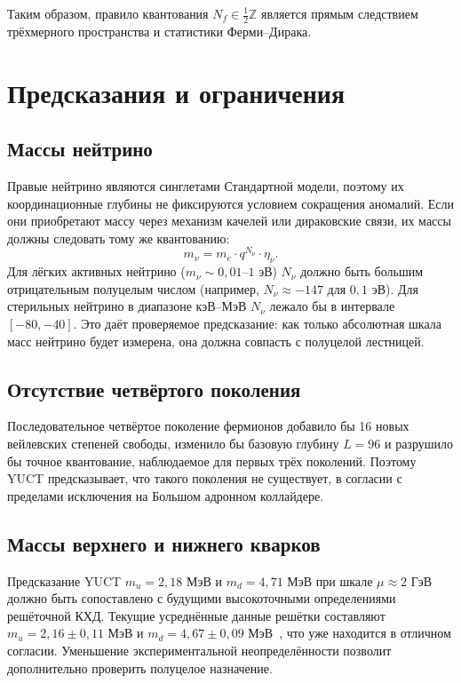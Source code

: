 \documentclass[12pt,a4paper]{article}
\begin{document}
	Таким образом, правило квантования \(N_f \in \frac{1}{2}\mathbb{Z}\) является прямым следствием трёхмерного пространства и статистики Ферми–Дирака.
	
	\section{Предсказания и ограничения}
	
	\subsection{Массы нейтрино}
	
	Правые нейтрино являются синглетами Стандартной модели, поэтому их координационные глубины не фиксируются условием сокращения аномалий. Если они приобретают массу через механизм качелей или дираковские связи, их массы должны следовать тому же квантованию:
	\begin{equation}
		m_\nu = m_e \cdot q^{N_\nu} \cdot \eta_\nu.
	\end{equation}
	Для лёгких активных нейтрино (\(m_\nu \sim 0,01\)–\(1\) эВ) \(N_\nu\) должно быть большим отрицательным полуцелым числом (например, \(N_\nu \approx -147\) для \(0,1\) эВ). Для стерильных нейтрино в диапазоне кэВ–МэВ \(N_\nu\) лежало бы в интервале \([-80, -40]\). Это даёт проверяемое предсказание: как только абсолютная шкала масс нейтрино будет измерена, она должна совпасть с полуцелой лестницей.
	
	\subsection{Отсутствие четвёртого поколения}
	
	Последовательное четвёртое поколение фермионов добавило бы 16 новых вейлевских степеней свободы, изменило бы базовую глубину \(L=96\) и разрушило бы точное квантование, наблюдаемое для первых трёх поколений. Поэтому YUCT предсказывает, что такого поколения не существует, в согласии с пределами исключения на Большом адронном коллайдере.
	
	\subsection{Массы верхнего и нижнего кварков}
	
	Предсказание YUCT \(m_u = 2,18\) МэВ и \(m_d = 4,71\) МэВ при шкале \(\mu \approx 2\) ГэВ должно быть сопоставлено с будущими высокоточными определениями решёточной КХД. Текущие усреднённые данные решётки составляют \(m_u = 2,16 \pm 0,11\) МэВ и \(m_d = 4,67 \pm 0,09\) МэВ~\cite{PDG2024}, что уже находится в отличном согласии. Уменьшение экспериментальной неопределённости позволит дополнительно проверить полуцелое назначение.
	
\end{document}
